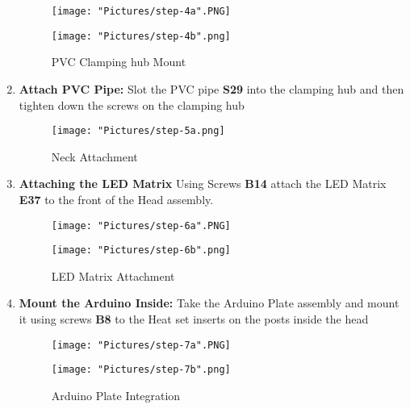 \documentclass[12pt]{article}
\begin{document}
\begin{enumerate}
\begin{figure}[H]
	\centering
  	\begin{minipage}[b]{0.45\textwidth}
		\texttt{[image: "Pictures/step-4a".PNG]}
  	\end{minipage}
  	\hfill
  	\begin{minipage}[b]{0.45\textwidth}
    		\texttt{[image: "Pictures/step-4b".png]}
  	\end{minipage}
  	\caption{PVC Clamping hub Mount}
\end{figure}

\item \textbf{Attach PVC Pipe:} Slot the PVC pipe \textbf{S29} into the clamping hub and then tighten down the screws on the clamping hub

\begin{figure}[H]
\centering
  \texttt{[image: "Pictures/step-5a.png]}
	\caption{Neck Attachment}
\end{figure}

\item \textbf{Attaching the LED Matrix} Using Screws \textbf{B14} attach the LED Matrix \textbf{E37} to the front of the Head assembly. 

\begin{figure}[H]
	\centering
  	\begin{minipage}[b]{0.45\textwidth}
		\texttt{[image: "Pictures/step-6a".PNG]}
  	\end{minipage}
  	\hfill
  	\begin{minipage}[b]{0.45\textwidth}
    		\texttt{[image: "Pictures/step-6b".png]}
  	\end{minipage}
  	\caption{LED Matrix Attachment}
\end{figure}

\item \textbf{Mount the Arduino Inside:} Take the Arduino Plate assembly and mount it using screws \textbf{B8} to the Heat set inserts on the posts inside the head

\begin{figure}[H]
	\centering
  	\begin{minipage}[b]{0.45\textwidth}
		\texttt{[image: "Pictures/step-7a".PNG]}
  	\end{minipage}
  	\hfill
  	\begin{minipage}[b]{0.45\textwidth}
    		\texttt{[image: "Pictures/step-7b".png]}
  	\end{minipage}
  	\caption{Arduino Plate Integration}
\end{figure}


\end{enumerate}
\end{document}
